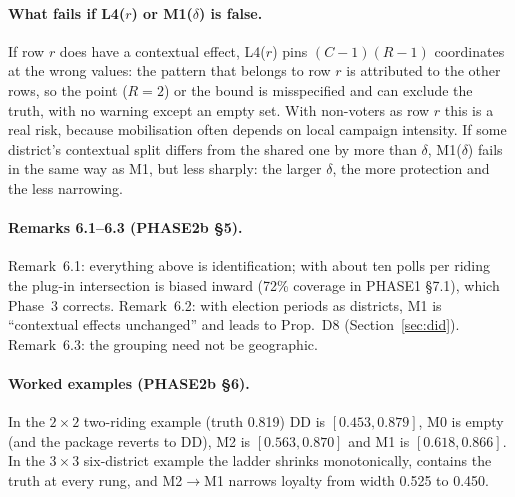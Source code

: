 \paragraph{What fails if L4($r$) or M1($\delta$) is false.} If row $r$ does have a
contextual effect, L4($r$) pins $(C-1)(R-1)$ coordinates at the wrong values: the
pattern that belongs to row $r$ is attributed to the other rows, so the point
($R=2$) or the bound is misspecified and can exclude the truth, with no warning
except an empty set. With non-voters as row $r$ this is a real risk, because
mobilisation often depends on local campaign intensity. If some district's
contextual split differs from the shared one by more than $\delta$, M1($\delta$)
fails in the same way as M1, but less sharply: the larger $\delta$, the more
protection and the less narrowing.


\paragraph{Remarks 6.1--6.3 (PHASE2b \S5).} Remark~6.1: everything above is
identification; with about ten polls per riding the plug-in intersection is
biased inward (72\% coverage in PHASE1 \S7.1), which Phase~3 corrects.
Remark~6.2: with election periods as districts, M1 is ``contextual effects
unchanged'' and leads to Prop.~D8 (Section~\ref{sec:did}). Remark~6.3: the
grouping need not be geographic.

\paragraph{Worked examples (PHASE2b \S6).} In the $2\times2$ two-riding example
(truth 0.819) DD is $[0.453,0.879]$, M0 is empty (and the package reverts to
DD), M2 is $[0.563,0.870]$ and M1 is $[0.618,0.866]$. In the $3\times3$
six-district example the ladder shrinks monotonically, contains the truth at every
rung, and M2$\to$M1 narrows loyalty from width 0.525 to 0.450.
